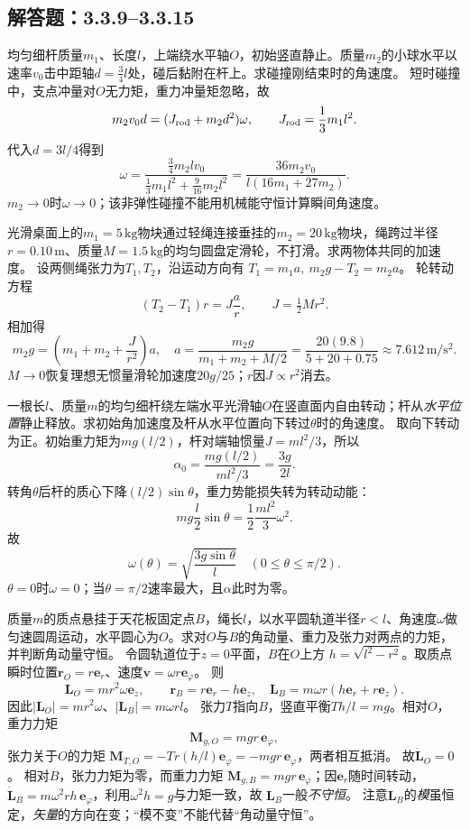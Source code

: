 \subsection{解答题：3.3.9--3.3.15}

\problemtext 均匀细杆质量$m_1$、长度$l$，上端绕水平轴$O$，初始竖直静止。质量$m_2$的小球水平以速率$v_0$击中距轴$d=\frac34l$处，碰后黏附在杆上。求碰撞刚结束时的角速度。
\workings
短时碰撞中，支点冲量对$O$无力矩，重力冲量矩忽略，故
\[
m_2v_0d=(J_{\rm rod}+m_2d^2)\omega,\qquad
J_{\rm rod}=\frac13m_1l^2.
\]
代入$d=3l/4$得到
\[
\boxed{\omega=
\frac{\frac34m_2lv_0}
{\frac13m_1l^2+\frac9{16}m_2l^2}
=\frac{36m_2v_0}{l(16m_1+27m_2)}}.
\]
\crosscheck $m_2\to0$时$\omega\to0$；该非弹性碰撞不能用机械能守恒计算瞬间角速度。

\problemtext 光滑桌面上的$m_1=5\,\mathrm{kg}$物块通过轻绳连接垂挂的$m_2=20\,\mathrm{kg}$物块，绳跨过半径$r=0.10\,\mathrm m$、质量$M=1.5\,\mathrm{kg}$的均匀圆盘定滑轮，不打滑。求两物体共同的加速度。
\workings
设两侧绳张力为$T_1,T_2$，沿运动方向有
$T_1=m_1a,\ m_2g-T_2=m_2a$。
轮转动方程
\[
(T_2-T_1)r=J\frac ar,\qquad J=\tfrac12Mr^2.
\]
相加得
\[
m_2g=\left(m_1+m_2+\frac J{r^2}\right)a,
\quad\boxed{
a=\frac{m_2g}{m_1+m_2+M/2}
=\frac{20(9.8)}{5+20+0.75}
\approx7.612\,\mathrm{m/s^2}}.
\]
\crosscheck $M\to0$恢复理想无惯量滑轮加速度$20g/25$；$r$因$J\propto r^2$消去。

\problemtext 一根长$l$、质量$m$的均匀细杆绕左端水平光滑轴$O$在竖直面内自由转动；杆从\emph{水平位置}静止释放。求初始角加速度及杆从水平位置向下转过$\theta$时的角速度。
\workings
取向下转动为正。初始重力矩为$mg(l/2)$，杆对端轴惯量$J=ml^2/3$，所以
\[
\boxed{\alpha_0=\frac{mg(l/2)}{ml^2/3}=\frac{3g}{2l}}.
\]
转角$\theta$后杆的质心下降$(l/2)\sin\theta$，重力势能损失转为转动动能：
\[
mg\frac l2\sin\theta=\frac12\frac{ml^2}{3}\omega^2.
\]
故
\[
\boxed{\omega(\theta)=\sqrt{\frac{3g\sin\theta}{l}}}
\quad(0\le\theta\le\pi/2).
\]
\crosscheck $\theta=0$时$\omega=0$；当$\theta=\pi/2$速率最大，且$\alpha$此时为零。

\problemtext 质量$m$的质点悬挂于天花板固定点$B$，绳长$l$，以水平圆轨道半径$r<l$、角速度$\omega$做匀速圆周运动，水平圆心为$O$。求对$O$与$B$的角动量、重力及张力对两点的力矩，并判断角动量守恒。
\workings
令圆轨道位于$z=0$平面，$B$在$O$上方
$h=\sqrt{l^2-r^2}$。取质点瞬时位置$\bm r_O=r\bm e_r$、速度$\bm v=\omega r\bm e_\varphi$。
则
\[
\boxed{\bm L_O=mr^2\omega\bm e_z},\qquad
\bm r_B=r\bm e_r-h\bm e_z,
\quad
\boxed{\bm L_B=m\omega r(h\bm e_r+r\bm e_z)}.
\]
因此$|\bm L_O|=mr^2\omega$、$|\bm L_B|=m\omega rl$。
张力$T$指向$B$，竖直平衡$Th/l=mg$。相对$O$，重力力矩
\[
\bm M_{g,O}=mgr\,\bm e_\varphi,
\]
张力关于$O$的力矩
$\bm M_{T,O}=-Tr(h/l)\bm e_\varphi=-mgr\,\bm e_\varphi$，两者相互抵消。
故$\boxed{\dot{\bm L}_O=0}$。
相对$B$，张力力矩为零，而重力力矩
$\boxed{\bm M_{g,B}=mgr\,\bm e_\varphi}$；因$\bm e_r$随时间转动，
$\dot{\bm L}_B=m\omega^2rh\,\bm e_\varphi$，利用$\omega^2h=g$与力矩一致，故
$\bm L_B$一般\emph{不守恒}。
\crosscheck 注意$\bm L_B$的\emph{模}虽恒定，\emph{矢量}的方向在变；“模不变”不能代替“角动量守恒”。

